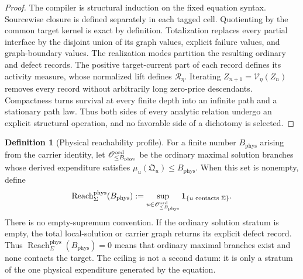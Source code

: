 \documentclass[11pt]{article}
\numberwithin{section}{part}
\theoremstyle{plain}
\theoremstyle{definition}
\newtheorem{definition}[definition]{Definition}
\theoremstyle{remark}
\newcommand{\Reach}{\operatorname{Reach}}
\newcommand{\Orbit}{\mathscr O}
\newcommand{\Phys}{\mathrm{phys}}
\newcommand{\Budget}{B_{\Phys}}
\begin{document}
\begin{proof}
The compiler is structural induction on the fixed equation syntax.
Sourcewise closure is defined separately in each tagged cell.  Quotienting
by the common target kernel is exact by definition.  Totalization replaces
every partial interface by the disjoint union of its graph values, explicit
failure values, and graph-boundary values.  The realization modes partition
the resulting ordinary and defect records.  The positive target-current part
of each record defines its activity measure, whose normalized lift defines
\(\mathcal R_\eta\).  Iterating
\(Z_{n+1}=\mathcal V_\eta(Z_n)\) removes every record without arbitrarily long
zero-price descendants.  Compactness turns survival at every finite depth
into an infinite path and a stationary path law.  Thus both sides of every
analytic relation undergo an explicit structural operation, and no favorable
side of a dichotomy is selected.
\end{proof}

\begin{definition}[Physical reachability profile]
\label{def:physical-reachability-profile}
For a finite number \(\Budget\) arising from the carrier identity, let
\(\Orbit^{\rm ord}_{\le\Budget}\) be the ordinary maximal solution branches
whose derived expenditure satisfies
\(\mu_u(\mathfrak Q_u)\le\Budget\).  When this set is nonempty, define
\begin{equation}
 \label{eq:physical-reachability-profile}
 \Reach^{\Phys}_\Sigma(\Budget)
 :=\sup_{u\in\Orbit^{\rm ord}_{\le\Budget}}
   \mathbf 1_{\{u\text{ contacts }\Sigma\}}.
\end{equation}
There is no empty-supremum convention.  If the ordinary solution stratum is
empty, the total local-solution or carrier graph returns its explicit defect
record.  Thus \(\Reach^{\Phys}_\Sigma(\Budget)=0\) means that ordinary
maximal branches exist and none contacts the target.  The ceiling is not a
second datum: it is only a stratum of the one physical expenditure generated
by the equation.
\end{definition}
\end{document}
